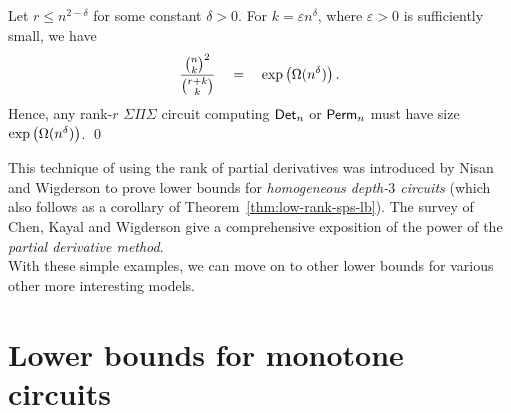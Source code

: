\documentclass[12pt]{report}
\renewcommand{\epsilon}{\varepsilon}
\begin{document}
\begin{theorem}\label{thm:low-rank-sps-lb}
Let $r \leq n^{2-\delta}$ for some constant $\delta > 0$. For $k = \epsilon n^{\delta}$, where $\epsilon > 0$ is sufficiently small, we have
$$
\frac{\binom{n}{k}^2}{\binom{r+k}{k}} \quad=\quad \exp\left(\Omega(n^{\delta})\right).
$$
Hence, any rank-$r$ $\Sigma\Pi\Sigma$ circuit computing $\mathsf{Det}_n$ or $\mathsf{Perm}_n$ must have size $\exp\left(\Omega(n^\delta)\right)$. \qed
\end{theorem}


This technique of using the rank of partial derivatives was introduced by Nisan and Wigderson \cite{nw1997} to prove lower bounds for \emph{homogeneous depth-$3$ circuits} (which also follows as a corollary of Theorem~\ref{thm:low-rank-sps-lb}). The survey of Chen, Kayal and Wigderson \cite{ckw11} give a comprehensive exposition of the power of the \emph{partial derivative method}. \\

With these simple examples, we can move on to other lower bounds for various other more interesting models. 

\chapter{Lower bounds for monotone circuits}
\end{document}
